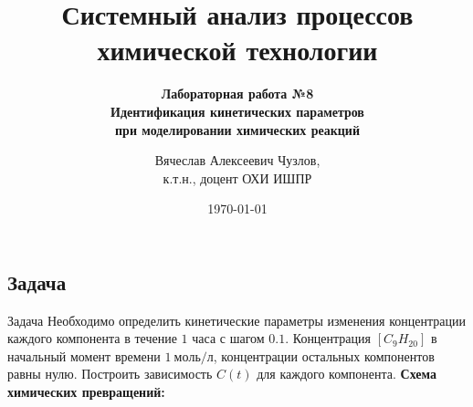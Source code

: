 \documentclass[aspectratio=169, mathserif]{beamer}%
\title{\LARGE{Системный анализ процессов химической технологии}}
\subtitle{\textcolor{tpugreen}{\textbf{Лабораторная работа №8}} \\ \textbf{Идентификация кинетических параметров \\ при моделировании химических реакций}}
\author[]{Вячеслав Алексеевич Чузлов, \\
к.т.н., доцент ОХИ ИШПР}
\date{\today}
\begin{document}
\newcommand{\pythoninline}[1]{%
	\colorbox{white}{%
		\parbox[b][.6em]{\widthof{\texttt{#1}}}{\texttt{#1}}%
	}%
}


\titleframe%



\subsection{Задача}
\begin{frame}[fragile, label=c]{Задача}
\scriptsize
Необходимо определить кинетические параметры изменения концентрации каждого компонента в течение $1$ часа с шагом $0.1$. Концентрация $\left[C_9H_{20}\right]$ в начальный момент времени $1\ \mathrm{моль / л}$, концентрации остальных компонентов равны нулю. Построить зависимость $C\left(t\right)$ для каждого компонента.
\vfill
\textbf{Схема химических превращений:}
\vfill
{}
\vfill
{}
\vfill
\end{frame}
\end{document}
